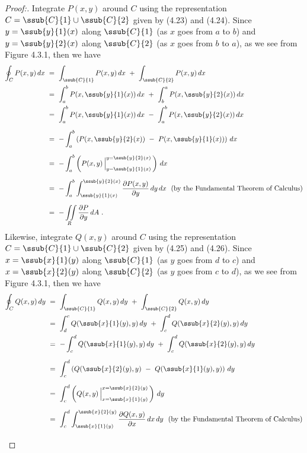 \begin{proof}[Proof:]
 \par\noindent Integrate $P(x,y)$ around $C$ using the representation $C = \ssub{C}{1} \cup \ssub{C}{2}$ given by (4.23)
 and (4.24).
   \noindent Since $y = \ssub{y}{1}(x)$ along $\ssub{C}{1}$ (as $x$ goes from $a$ to $b$) and $y = \ssub{y}{2}(x)$ along
 $\ssub{C}{2}$ (as $x$ goes from $b$ to $a$), as we see from Figure 4.3.1, then we have
 \begin{align*}
  \oint_C P(x,y)\,dx ~&=~ \int_{\ssub{C}{1}} P(x,y)\,dx ~+~ \int_{\ssub{C}{2}} P(x,y)\,dx\\
   &=~ \int_a^b P(x,\ssub{y}{1}(x))\,dx ~+~ \int_b^a P(x,\ssub{y}{2}(x))\,dx\\
   &=~ \int_a^b P(x,\ssub{y}{1}(x))\,dx ~-~ \int_a^b P(x,\ssub{y}{2}(x))\,dx\\[6pt]
   &=~ -\int_a^b \left( P(x,\ssub{y}{2}(x)) ~-~ P(x,\ssub{y}{1}(x)) \right)\,dx\\[6pt]
   &=~ -\int_a^b \left( P(x,y) \,\Big|_{y = \ssub{y}{1}(x)}^{y = \ssub{y}{2}(x)} \,\right)\,dx\\[6pt]
   &=~ -\int_a^b \int_{\ssub{y}{1}(x)}^{\ssub{y}{2}(x)} \frac{\partial P(x,y)}{\partial y}\,dy\,dx ~~\text{(by the
    Fundamental Theorem of Calculus)}\\[6pt]
   &=~ -\iint\limits_{R} \frac{\partial P}{\partial y}\,dA ~.
 \end{align*}
 Likewise, integrate $Q(x,y)$ around $C$ using the representation $C = \ssub{C}{1} \cup \ssub{C}{2}$ given by (4.25) and
 (4.26). Since $x = \ssub{x}{1}(y)$ along $\ssub{C}{1}$ (as $y$ goes from $d$ to $c$) and $x = \ssub{x}{2}(y)$ along
 $\ssub{C}{2}$ (as $y$ goes from $c$ to $d$), as we see from Figure 4.3.1, then we have
 \begin{align*}
  \oint_C Q(x,y)\,dy ~&=~ \int_{\ssub{C}{1}} Q(x,y)\,dy ~+~ \int_{\ssub{C}{2}} Q(x,y)\,dy\\
   &=~ \int_d^c Q(\ssub{x}{1}(y),y)\,dy ~+~ \int_c^d Q(\ssub{x}{2}(y),y)\,dy\\
   &=~ -\int_c^d Q(\ssub{x}{1}(y),y)\,dy ~+~ \int_c^d Q(\ssub{x}{2}(y),y)\,dy\\[6pt]
   &=~ \int_c^d \left( Q(\ssub{x}{2}(y),y) ~-~ Q(\ssub{x}{1}(y),y) \right)\,dy\\[6pt]
   &=~ \int_c^d \left( Q(x,y) \,\Big|_{x = \ssub{x}{1}(y)}^{x = \ssub{x}{2}(y)} \,\right)\,dy\\[6pt]
   &=~ \int_c^d \int_{\ssub{x}{1}(y)}^{\ssub{x}{2}(y)} \frac{\partial Q(x,y)}{\partial x}\,dx\,dy ~~\text{(by the
    Fundamental Theorem of Calculus)}\\[6pt]

\end{align*}
\end{proof}
